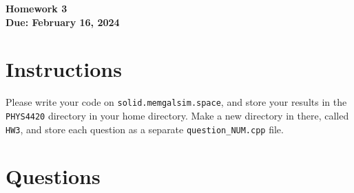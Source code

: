 \documentclass[11pt]{article}
\begin{document}
\begin{center}
\textbf{\Large Homework 3}\\
\textbf{Due: February 16, 2024}\\
\end{center}
\section*{Instructions}
Please write your code on \texttt{solid.memgalsim.space}, and store your results
in the \texttt{PHYS4420} directory in your home directory.  Make a new directory in there, called \texttt{HW3}, and 
store each question as a separate \texttt{question\_NUM.cpp} file.
\section*{Questions}
\end{document}
